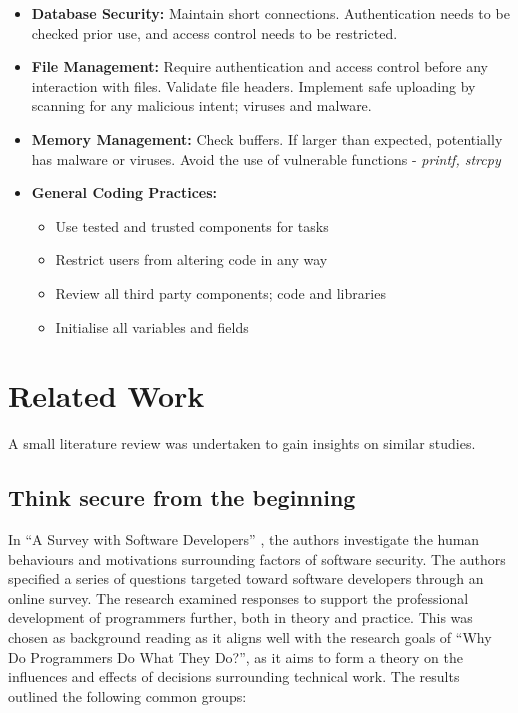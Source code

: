 \begin{itemize}
\item \textbf{Database Security:} Maintain short connections. Authentication needs to be checked prior use, and access control needs to be restricted. 
\item \textbf{File Management:} Require authentication and access control before any interaction with files. Validate file headers. Implement safe uploading by scanning for any malicious intent; viruses and malware. 
\item \textbf{Memory Management:} Check buffers. If larger than expected, potentially has malware or viruses. Avoid the use of vulnerable functions - \textit{printf, strcpy}
\item \textbf{General Coding Practices:}
\begin{itemize}
\item Use tested and trusted components for tasks
\item Restrict users from altering code in any way
\item Review all third party components; code and libraries
\item Initialise all variables and fields
\end{itemize}
\end{itemize}

\newpage
\section{Related Work}

A small literature review was undertaken to gain insights on similar studies.

\subsection{Think secure from the beginning}

In “A Survey with Software Developers” \cite{summary1}, the authors investigate the human behaviours and motivations surrounding factors of software security. The authors specified a series of questions targeted toward software developers through an online survey. The research examined responses to support the professional development of programmers further, both in theory and practice. This was chosen as background reading as it aligns well with the research goals of “Why Do Programmers Do What They Do?”, as it aims to form a theory on the influences and effects of decisions surrounding technical work. 
\newline
\newline
The results outlined the following common groups:

